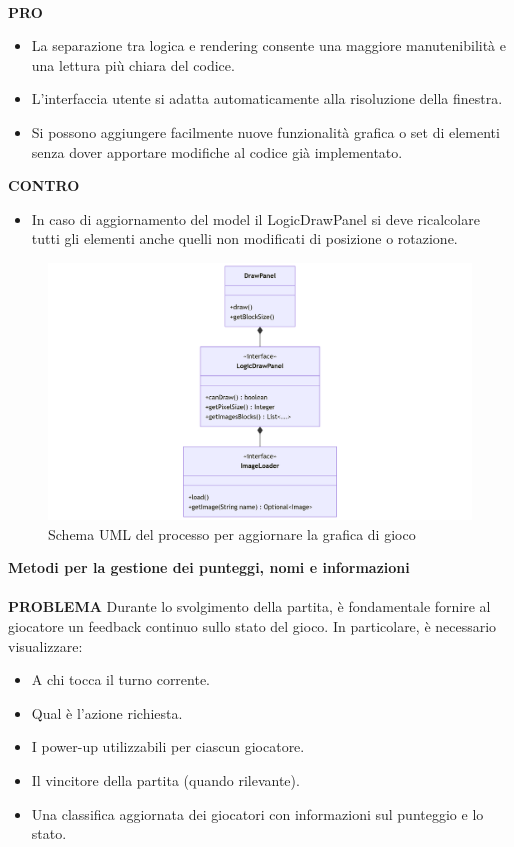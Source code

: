 \documentclass[a4paper,12pt]{report}
\begin{document}
\\
\textbf{PRO}
\begin{itemize}
	\item La separazione tra logica e rendering consente una maggiore manutenibilità e una lettura più chiara del codice.
	\item L'interfaccia utente si adatta automaticamente alla risoluzione della finestra.
	\item Si possono aggiungere facilmente nuove funzionalità grafica o set di elementi senza dover apportare modifiche al codice già implementato.
\end{itemize}
\textbf{CONTRO}
\begin{itemize}
	\item In caso di aggiornamento del model il LogicDrawPanel si deve ricalcolare tutti gli elementi anche quelli non modificati di posizione o rotazione.
\end{itemize}
\begin{figure}[H]
	\centering{}
	\includegraphics[width=14cm]{img/DisegnareGrafica.png}
	\caption{Schema UML del processo per aggiornare la grafica di gioco}
	\label{img:Aggiornamento Grafica}
\end{figure}
\textbf{Metodi per la gestione dei punteggi, nomi e informazioni}
\\
\\
\textbf{PROBLEMA}
Durante lo svolgimento della partita, è fondamentale fornire al giocatore un feedback continuo sullo stato del gioco. In particolare, è necessario visualizzare:
\begin{itemize}
	\item A chi tocca il turno corrente.
	\item Qual è l’azione richiesta.
	\item I power-up utilizzabili per ciascun giocatore.
	\item Il vincitore della partita (quando rilevante).
	\item Una classifica aggiornata dei giocatori con informazioni sul punteggio e lo stato.
\end{itemize}
\end{document}
